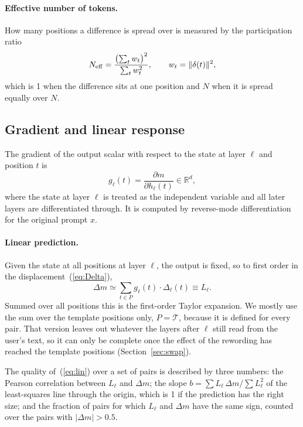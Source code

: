 \documentclass[11pt]{article}
\newcommand{\cT}{\mathcal{T}}
\newcommand{\Dm}{\Delta m}
\begin{document}
\paragraph{Effective number of tokens.} How many positions a difference is spread over is measured by the participation ratio
\begin{equation}
N_{\rm eff}=\frac{\bigl(\sum_t w_t\bigr)^2}{\sum_t w_t^2},\qquad w_t=\lVert\delta(t)\rVert^2 ,
\label{eq:neff}
\end{equation}
which is 1 when the difference sits at one position and $N$ when it is spread equally over $N$.

\subsection{Gradient and linear response}
\label{sec:linresp}

The gradient of the output scalar with respect to the state at layer $\ell$ and position $t$ is
\begin{equation}
g_\ell(t)=\frac{\partial m}{\partial h_\ell(t)}\in\mathbb{R}^d ,
\label{eq:g}
\end{equation}
where the state at layer $\ell$ is treated as the independent variable and all later layers are differentiated through. It is computed by reverse-mode differentiation for the original prompt $x$.

\paragraph{Linear prediction.} Given the state at all positions at layer $\ell$, the output is fixed, so to first order in the displacement~(\ref{eq:Delta}),
\begin{equation}
\Dm\simeq \sum_{t\in P} g_\ell(t)\cdot\Delta_\ell(t)\equiv L_\ell .
\label{eq:lin}
\end{equation}
Summed over all positions this is the first-order Taylor expansion. We mostly use the sum over the template positions only, $P=\cT$, because it is defined for every pair. That version leaves out whatever the layers after $\ell$ still read from the user's text, so it can only be complete once the effect of the rewording has reached the template positions (Section~\ref{sec:swap}).

The quality of~(\ref{eq:lin}) over a set of pairs is described by three numbers: the Pearson correlation between $L_\ell$ and $\Dm$; the slope $b=\sum L_\ell\,\Dm/\sum L_\ell^2$ of the least-squares line through the origin, which is 1 if the prediction has the right size; and the fraction of pairs for which $L_\ell$ and $\Dm$ have the same sign, counted over the pairs with $|\Dm|>0.5$.
\end{document}
